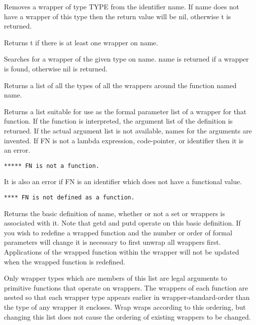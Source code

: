{    Removes a wrapper of type TYPE from the identifier name.  If
    name  does  not  have a wrapper of this type then the return
    value will be nil, otherwise t is returned.
}

{    Returns t if there is at least one wrapper on name.
}

{    Searches for a wrapper of the given type on name.   name  is
    returned if a wrapper is found, otherwise nil is returned.
}

{    Returns  a  list of all the types of all the wrappers around
    the function named name.
}

{    Returns a list suitable for use as the formal parameter list
    of a wrapper for  that  function.      If  the  function  is
    interpreted,   the   argument  list  of  the  definition  is
    returned.  If the actual argument  list  is  not  available,
    names for the arguments are invented.  If FN is not a lambda
    expression, code-pointer, or identifier then it is an error.
}
\begin{verbatim}
***** FN is not a function.
\end{verbatim}
    It  is  also  an error if FN is an identifier which does not
    have a functional value.

{\tt ***** FN is not defined as a function.}

{    Returns the basic definition of name, whether or not  a  set
    or  wrappers is associated with it.  Note that getd and putd
    operate on this basic definition.  If you wish to redefine a
    wrapped  function  and  the  number  or  order   of   formal
    parameters  will  change it is necessary to first unwrap all
    wrappers first.  Applications of the wrapped function within
    the wrapper will not be updated when the wrapped function is
    redefined.
}

{
    Only wrapper types which are members of this list are  legal
    arguments  to  primitive functions that operate on wrappers.
    The wrappers of  each  function  are  nested  so  that  each
    wrapper  type appears earlier in wrapper-standard-order than
    the type of any wrapper it encloses.
    Wrap wraps according to this  ordering,  but  changing  this
    list  does not cause the ordering of existing wrappers to be
    changed.
}


